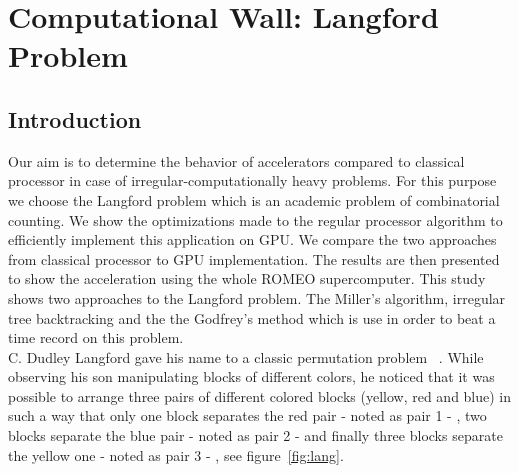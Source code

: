 
\chapter{Computational Wall: Langford Problem}

\section{Introduction}
Our aim is to determine the behavior of accelerators compared to classical processor in case of irregular-computationally heavy problems.
For this purpose we choose the Langford problem which is an academic problem of combinatorial counting.
We show the optimizations made to the regular processor algorithm to efficiently implement this application on GPU. 
We compare the two approaches from classical processor to GPU implementation. 
The results are then presented to show the acceleration using the whole ROMEO supercomputer.
This study shows two approaches to the Langford problem.
The Miller's algorithm, irregular tree backtracking and the the Godfrey's method which is use in order to beat a time record on this problem.\\

C. Dudley Langford gave his name to a classic permutation problem ~\cite{Gard56, Simp83}.  
While observing his son manipulating blocks of different colors, he noticed that it was possible to arrange three pairs of different colored blocks (yellow, red and blue) in such a way that only one block separates the red pair - noted as pair 1 - , two blocks separate the blue pair - noted as pair 2 - and finally three blocks separate the yellow one - noted as pair 3 - , see figure~\ref{fig:lang}.\\

